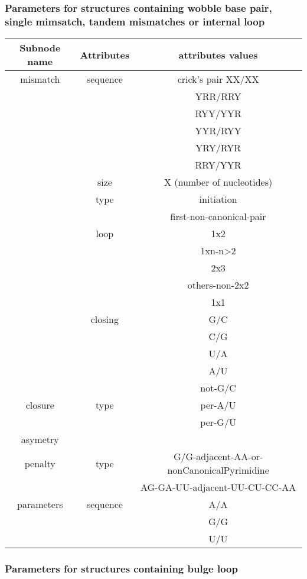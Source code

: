 \documentclass{article}
\begin{document}
\pagebreak
\subsubsection{Parameters for structures containing wobble base pair, single mimsatch, tandem mismatches or internal loop}

\begin{table}[hc]
\begin{tabular}[h]{| c | c | c |}
\textbf{Subnode name} & \textbf{Attributes} & \textbf{attributes values} \\
 \hline
mismatch & sequence & crick's pair XX/XX \\
 & & YRR/RRY \\
 & & RYY/YYR \\
 & & YYR/RYY \\
 & & YRY/RYR \\
 & & RRY/YYR \\
 & size & X (number of nucleotides) \\
 & type & initiation \\
 & & first-non-canonical-pair \\
 & loop & 1x2 \\
 & & 1xn-n>2 \\
 & & 2x3 \\
 & & others-non-2x2 \\
 & & 1x1 \\
 & closing & G/C \\
 & & C/G \\
 & & U/A \\
 & & A/U \\
 & & not-G/C \\
  \hline
closure & type & per-A/U \\
 & & per-G/U \\
  \hline
asymetry & & \\
 \hline
penalty & type & G/G-adjacent-AA-or-nonCanonicalPyrimidine \\
 & & AG-GA-UU-adjacent-UU-CU-CC-AA \\
  \hline
parameters & sequence & A/A \\
 & & G/G \\
 & & U/U \\
  \hline
\end{tabular}
\end{table}

\clearpage
\subsubsection{Parameters for structures containing bulge loop}
\end{document}
